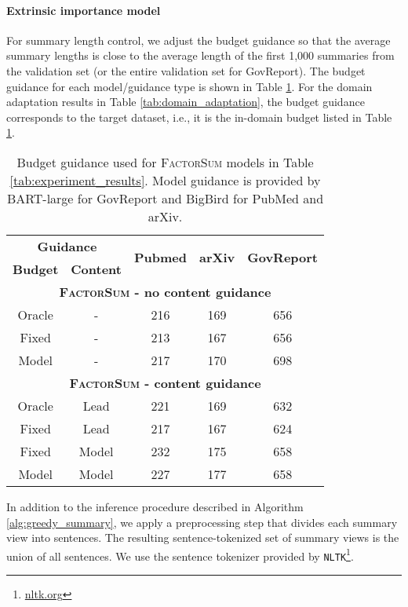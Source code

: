 \documentclass[11pt,table]{article}
\newcommand{\modelname}{FactorSum}
\begin{document}
\paragraph{Extrinsic importance model}
For summary length control, we adjust the budget guidance so that the average summary lengths is close to the average length of the first 1,000 summaries from the validation set (or the entire validation set for GovReport). The budget guidance for each model/guidance type is shown in Table \ref{tab:budget_guidance}. For the domain adaptation results in Table \ref{tab:domain_adaptation}, the budget guidance corresponds to the target dataset, i.e., it is the in-domain budget listed in Table \ref{tab:budget_guidance}.

\begin{table}
  \centering
  \setlength\tabcolsep{2.2pt}
  \begin{tabular}{cc|c|c|c}
    \toprule
    \multicolumn{2}{c|}{\textbf{Guidance}} & \multirow{2}{1.4cm}{\centering \textbf{Pubmed}} & \multirow{2}{1.cm}{\centering \textbf{arXiv}} & \multirow{2}{1.9cm}{\centering \textbf{GovReport}} \\
    \textbf{Budget} & \textbf{Content} & \, & \\
    \toprule
    \multicolumn{5}{c}{\textbf{\textsc{\modelname} - no content guidance}} \\
    \midrule
    Oracle & - & 216 & 169 & 656 \\
    Fixed & - & 213 & 167 & 656 \\
    Model & - & 217 & 170 & 698 \\
    \midrule
    \multicolumn{5}{c}{\textbf{\textsc{\modelname} - content guidance}} \\
    \midrule
    Oracle & Lead & 221 & 169 & 632 \\
    Fixed & Lead & 217 & 167 & 624 \\
    Fixed & Model & 232 & 175 & 658 \\
    Model & Model & 227 & 177 & 658 \\
    \bottomrule
  \end{tabular}
  \caption{Budget guidance used for \textsc{\modelname} models in Table \ref{tab:experiment_results}. Model guidance is provided by BART-large for GovReport and BigBird for PubMed and arXiv.}\label{tab:budget_guidance}
\end{table}

In addition to the inference procedure described in Algorithm \ref{alg:greedy_summary}, we apply a preprocessing step that divides each summary view  into sentences. The resulting sentence-tokenized set of summary views  is the union of all sentences. We use the sentence tokenizer provided by \texttt{NLTK}\footnote{\url{nltk.org}}. 
\end{document}
